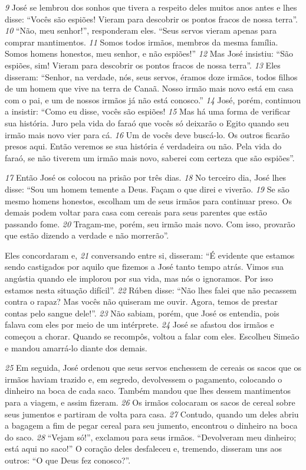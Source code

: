 \bigskip   
\textit{\tiny 9} 
José
se lembrou dos sonhos que tivera a respeito deles muitos anos antes e lhes disse:
“Vocês são espiões! Vieram para descobrir os pontos fracos de nossa terra”.
\textit{\tiny 10}
“Não, meu senhor!”, responderam eles. “Seus servos vieram apenas para
comprar mantimentos. 
\textit{\tiny 11}
Somos todos irmãos, membros da mesma família.
Somos homens honestos, meu senhor, e não espiões!”
\textit{\tiny 12}
Mas José insistiu: “São espiões, sim! Vieram para descobrir os pontos fracos
de nossa terra”.
\textit{\tiny 13}
Eles disseram: “Senhor, na verdade, nós, seus servos, éramos doze irmãos,
todos filhos de um homem que vive na terra de Canaã. Nosso irmão mais novo
está em casa com o pai, e um de nossos irmãos já não está conosco.”
\textit{\tiny 14}
José, porém, continuou a insistir: “Como eu disse, vocês são espiões! 
\textit{\tiny 15}
Mas há
uma forma de verificar sua história. Juro pela vida do faraó que vocês só deixarão
o Egito quando seu irmão mais novo vier para cá. 
\textit{\tiny 16}
Um de vocês deve buscá-lo.
Os outros ficarão presos aqui. Então veremos se sua história é verdadeira ou não.
Pela vida do faraó, se não tiverem um irmão mais novo, saberei com certeza que
são espiões”.

\bigskip   
\textit{\tiny 17}
Então José os colocou na prisão por três dias. 
\textit{\tiny 18}
No terceiro dia, José lhes
disse: “Sou um homem temente a Deus. Façam o que direi e viverão. 
\textit{\tiny 19}
Se são
mesmo homens honestos, escolham um de seus irmãos para continuar preso. Os
demais podem voltar para casa com cereais para seus parentes que estão
passando fome. 
\textit{\tiny 20}
Tragam-me, porém, seu irmão mais novo. Com isso, provarão
que estão dizendo a verdade e não morrerão”.

\bigskip   
   Eles concordaram e, 
\textit{\tiny 21}
conversando entre si, disseram: “É evidente que estamos
sendo castigados por aquilo que fizemos a José tanto tempo atrás. Vimos sua
angústia quando ele implorou por sua vida, mas nós o ignoramos. Por isso
estamos nesta situação difícil”.
\textit{\tiny 22}
Rúben disse: “Não lhes falei que não pecassem contra o rapaz? Mas vocês não
quiseram me ouvir. Agora, temos de prestar contas pelo sangue dele!”.
\textit{\tiny 23}
Não sabiam, porém, que José os entendia, pois falava com eles por meio de
um intérprete. 
\textit{\tiny 24}
José se afastou dos irmãos e começou a chorar. Quando se
recompôs, voltou a falar com eles. Escolheu Simeão e mandou amarrá-lo diante
dos demais.

\bigskip   
\textit{\tiny 25}
Em seguida, José ordenou que seus servos enchessem de cereais os sacos que
os irmãos haviam trazido e, em segredo, devolvessem o pagamento, colocando o
dinheiro na boca de cada saco. Também mandou que lhes dessem mantimentos
para a viagem, e assim fizeram. 
\textit{\tiny 26}
Os irmãos colocaram os sacos de cereal sobre
seus jumentos e partiram de volta para casa.
\textit{\tiny 27}
Contudo, quando um deles abriu a bagagem a fim de pegar cereal para seu
jumento, encontrou o dinheiro na boca do saco. 
\textit{\tiny 28}
“Vejam só!”, exclamou para
seus irmãos. “Devolveram meu dinheiro; está aqui no saco!” O coração deles
desfaleceu e, tremendo, disseram uns aos outros: “O que Deus fez conosco?”.

